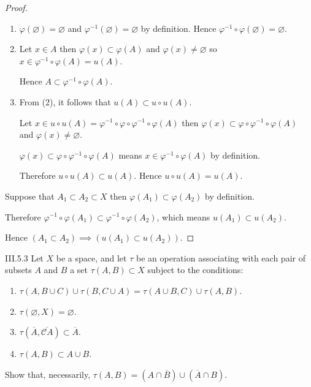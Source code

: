\begin{proof}
    \begin{enumerate}[label={(\arabic*)}]
        \item \( \varphi(\varnothing) = \varnothing \) and \( \varphi^{-1}(\varnothing) = \varnothing \) by definition. Hence \( \varphi^{-1} \circ \varphi(\varnothing) = \varnothing \).
        \item Let \( x \in A \) then \( \varphi(x) \subset \varphi(A) \) and \( \varphi(x) \ne \varnothing \) so \( x \in \varphi^{-1}\circ \varphi(A) = u(A) \).

              Hence \( A \subset \varphi^{-1} \circ \varphi(A) \).
        \item From (2), it follows that \( u(A) \subset u \circ u(A) \).

              Let \( x \in u \circ u(A) = \varphi^{-1} \circ \varphi \circ \varphi^{-1} \circ \varphi(A) \) then \( \varphi(x) \subset \varphi \circ \varphi^{-1} \circ \varphi(A) \) and \( \varphi(x) \ne \varnothing \).

              \( \varphi(x) \subset \varphi \circ \varphi^{-1} \circ \varphi(A) \) means \( x \in \varphi^{-1} \circ \varphi(A) \) by definition.

              Therefore \( u \circ u(A) \subset u(A) \). Hence \( u \circ u(A) = u(A) \).
    \end{enumerate}

    Suppose that \( A_{1} \subset A_{2} \subset X \) then \( \varphi(A_{1}) \subset \varphi(A_{2}) \) by definition.

    Therefore \( \varphi^{-1} \circ \varphi(A_{1}) \subset \varphi^{-1} \circ \varphi(A_{2}) \), which means \( u(A_{1}) \subset u(A_{2}) \).

    Hence \( (A_{1} \subset A_{2}) \implies (u(A_{1}) \subset u(A_{2})) \).
\end{proof}

\begin{problem}{III.5.3}
Let \(X\) be a space, and let \( \tau \) be an operation associating with each pair of subsets \(A\) and \(B\) a set \(\tau(A, B) \subset X\) subject to the conditions:
\begin{enumerate}[label={\alph*.}]
    \item \( \tau(A, B \cup C) \cup \tau(B, C\cup A) = \tau(A\cup B, C) \cup \tau(A, B) \).
    \item \( \tau(\varnothing, X) = \varnothing \).
    \item \( \tau(\overline{A}, \overline{\mathscr{C}A}) \subset \overline{A} \).
    \item \( \tau(A, B) \subset A \cup B \).
\end{enumerate}

Show that, necessarily, \( \tau(A, B) = (A \cap \overline{B}) \cup (\overline{A} \cap B) \).
\end{problem}

